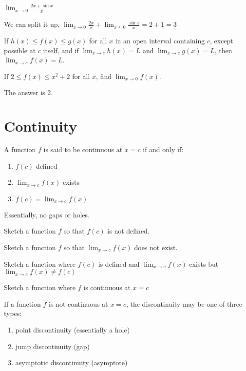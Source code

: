 \documentclass[../bccalc.tex]{subfiles}
\begin{document}
\begin{example}
    $\lim_{x\to 0}\frac{2x+\sin x}{x}$

    We can split it up, $\lim_{x\to 0}\frac{2x}{x}+\lim_{x\leq 0}\frac{\sin x}{x}=2+1=3$
\end{example}

\begin{theorem}
    If $h(x)\leq f(x)\leq g(x)$ for all $x$ in an open interval containing $c$, except possible at $c$ itself, and if $\lim_{x\to c}h(x)=L$ and $\lim_{x\to c}g(x)=L$, then $\lim_{x\to c}f(x)=L$.
\end{theorem}

\begin{example}
    If $2\leq f(x)\leq x^2+2$ for all $x$, find $\lim_{x\to 0}f(x)$.

    The answer is 2.
\end{example}

\pagebreak
\section{Continuity}
\begin{definition}[Continuity]
    A function $f$ is said to be continuous at $x=c$ if and only if:
    \begin{enumerate}
        \item $f(c)$ defined 
        \item $\lim_{x\to c}f(x)$ exists 
        \item $f(c)=\lim_{x\to c}f(x)$
    \end{enumerate}

    Essentially, no gaps or holes.
\end{definition}

\ex Sketch a function $f$ so that $f(c)$ is not defined. 

\ex Sketch a function $f$ so that $\lim_{x\to c}f(x)$ does not exist.

\ex Sketch a function where $f(c)$ is defined and $\lim_{x\to c}f(x)$ exists but $\lim_{x\to c}f(x)\neq f(c)$

\ex Sketch a function where $f$ is continuous at $x=c$

If a function $f$ is not continuous at $x=c$, the discontinuity may be one of three types:
\begin{enumerate}
    \item point discontinuity (essentially a hole)
    \item jump discontinuity (gap)
    \item asymptotic discontinuity (asymptote)
\end{enumerate}
\end{document}
